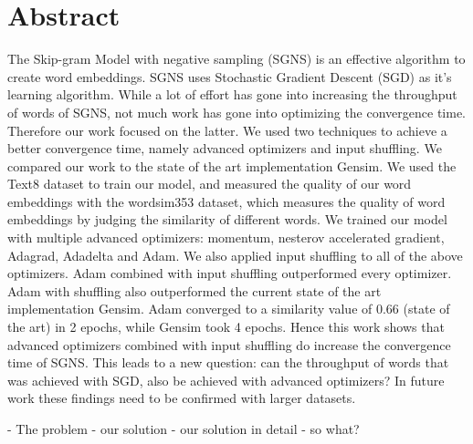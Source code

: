 \chapter*{Abstract}
The Skip-gram Model with negative sampling (SGNS) is an effective algorithm to create word embeddings. SGNS  uses Stochastic Gradient Descent (SGD) as it's learning algorithm. While a lot of effort has gone into increasing the throughput of words of SGNS, not much work has gone into optimizing the convergence time. Therefore our work focused on the latter. We used two techniques to achieve a better convergence time, namely advanced optimizers and input shuffling. We compared our work to the state of the art implementation Gensim. We used the Text8 dataset to train our model, and measured the quality of our word embeddings with the wordsim353 dataset, which measures the quality of word embeddings by judging the similarity of different words. We trained our model with multiple advanced optimizers: momentum, nesterov accelerated gradient, Adagrad, Adadelta and Adam. We also applied input shuffling to all of the above optimizers. Adam combined with input shuffling outperformed every optimizer. Adam with shuffling also outperformed the current state of the art implementation Gensim. Adam converged to a similarity value of 0.66 (state of the art) in 2 epochs, while Gensim took 4 epochs. Hence this work shows that advanced optimizers combined with input shuffling do increase the convergence time of SGNS. This leads to a new question: can the throughput of words that was achieved with SGD, also be achieved with advanced optimizers? In future work these findings need to be confirmed with larger datasets.

- The problem
- our solution
- our solution in detail
- so what? 